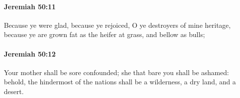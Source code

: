 		\paragraph{Jeremiah 50:11} %
			\label{JEREMIAH-50-11}

			Because ye were glad, because ye rejoiced, O ye destroyers of mine heritage, because ye are grown fat as the heifer at grass, and bellow as bulls;


		\paragraph{Jeremiah 50:12} %
			\label{JEREMIAH-50-12}

			Your mother shall be sore confounded; she that bare you shall be ashamed: behold, the hindermost of the nations shall be a wilderness, a dry land, and a desert.



